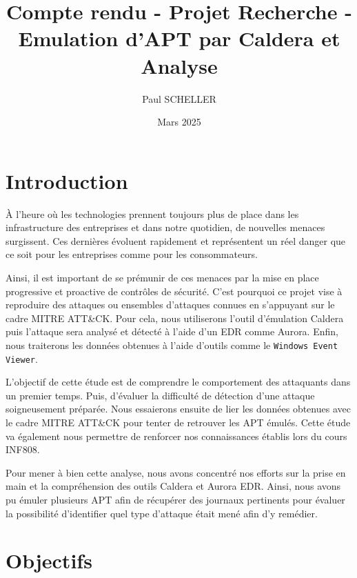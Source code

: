 \documentclass[12pt,letterpaper]{article}
\title{Compte rendu - Projet Recherche - Emulation d'APT par Caldera et Analyse}
\author{Paul SCHELLER}
\date{Mars 2025}
\begin{document}



\newpage
\renewcommand{\contentsname}{Plan de l'étude}
\tableofcontents


\newpage
\section{Introduction}

À l'heure où les technologies prennent toujours plus de place dans les infrastructure des entreprises et dans notre quotidien, de nouvelles menaces surgissent.
Ces dernières évoluent rapidement et représentent un réel danger que ce soit pour les entreprises comme pour les consommateurs.

\bigskip

Ainsi, il est important de se prémunir de ces menaces par la mise en place progressive et proactive de contrôles de sécurité.
C'est pourquoi ce projet vise à reproduire des attaques ou ensembles d'attaques connues en s'appuyant sur le cadre MITRE ATT\&CK.
Pour cela, nous utiliserons l'outil d'émulation Caldera puis l'attaque sera analysé et détecté à l'aide d'un EDR comme Aurora.
Enfin, nous traiterons les données obtenues à l'aide d'outils comme le \verb|Windows Event Viewer|.

\bigskip

L'objectif de cette étude est de comprendre le comportement des attaquants dans un premier temps.
Puis, d'évaluer la difficulté de détection d'une attaque soigneusement préparée.
Nous essaierons ensuite de lier les données obtenues avec le cadre MITRE ATT\&CK pour tenter de retrouver les APT émulés.
Cette étude va également nous permettre de renforcer nos connaissances établis lors du cours INF808.

\bigskip

Pour mener à bien cette analyse, nous avons concentré nos efforts sur la prise en main et la compréhension des outils Caldera et Aurora EDR.
Ainsi, nous avons pu émuler plusieurs APT afin de récupérer des journaux pertinents pour évaluer la possibilité d'identifier quel type d'attaque était mené afin d'y remédier.

\newpage
\section{Objectifs}
\end{document}
